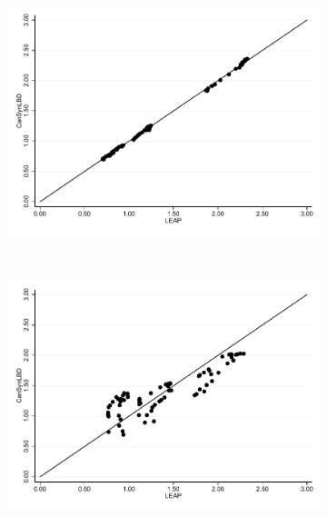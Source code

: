 \documentclass[10pt,twoside]{article}
\begin{document}
\begin{figure}[H]
\centering
\begin{subfigure}[h]{0.5\linewidth}
\includegraphics[trim=0 10 0 0,clip, width=\linewidth]{graphs/Share_of_firms_by_NAICS_two-digit_and_year_Manufacturing_bw.pdf}
\end{subfigure}\\
\begin{subfigure}[h]{0.5\linewidth}
\includegraphics[trim=0 10 0 -20,clip,width=\linewidth]{graphs/Share_of_employment_by_NAICS_two-digit_and_year_Manufacturing_bw.pdf}
\end{subfigure}\\
\begin{subfigure}[h]{0.5\linewidth}

\end{subfigure}
\end{figure}
\end{document}

